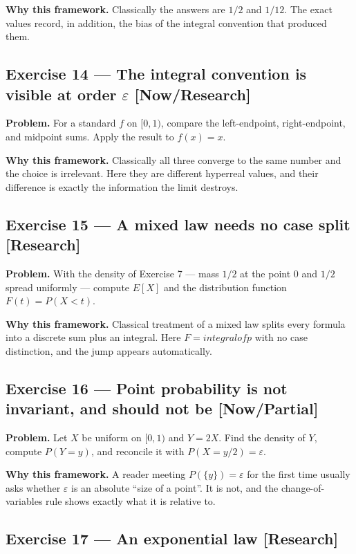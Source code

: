 \documentclass[11pt]{article}
\newcommand{\eps}{\varepsilon}
\begin{document}
\textbf{Why this framework.} Classically the answers are $1/2$ and $1/12$. The
exact values record, in addition, the bias of the integral convention that
produced them.


\subsection*{Exercise 14 --- The integral convention is visible at order $\eps$ \hfill \normalfont\small[Now/Research]}

\textbf{Problem.} For a standard $f$ on $[0,1)$, compare the left-endpoint,
right-endpoint, and midpoint sums. Apply the result to $f(x) = x$.

\textbf{Why this framework.} Classically all three converge to the same number and
the choice is irrelevant. Here they are different hyperreal values, and their
difference is exactly the information the limit destroys.


\subsection*{Exercise 15 --- A mixed law needs no case split \hfill \normalfont\small[Research]}

\textbf{Problem.} With the density of Exercise 7 --- mass $1/2$ at the point $0$ and
$1/2$ spread uniformly --- compute $E[X]$ and the distribution function
$F(t) = P(X < t)$.

\textbf{Why this framework.} Classical treatment of a mixed law splits every
formula into a discrete sum plus an integral. Here $F = integral of p$ with no
case distinction, and the jump appears automatically.


\subsection*{Exercise 16 --- Point probability is not invariant, and should not be \hfill \normalfont\small[Now/Partial]}

\textbf{Problem.} Let $X$ be uniform on $[0,1)$ and $Y = 2X$. Find the density of
$Y$, compute $P(Y = y)$, and reconcile it with $P(X = y/2) = \eps$.

\textbf{Why this framework.} A reader meeting $P(\{y\}) = \eps$ for the first time
usually asks whether $\eps$ is an absolute ``size of a point''. It is not,
and the change-of-variables rule shows exactly what it is relative to.


\subsection*{Exercise 17 --- An exponential law \hfill \normalfont\small[Research]}
\end{document}
